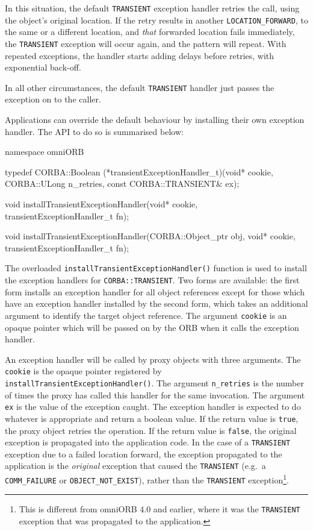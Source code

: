 \documentclass[11pt,twoside,a4paper]{book}
\newcommand{\code}[1]{\texttt{#1}}
\newcommand{\op}[1]{\texttt{#1()}}
\newcommand{\dsc}{\discretionary{}{}{}}
\begin{document}
In this situation, the default \code{TRANSIENT} exception handler
retries the call, using the object's original location. If the retry
results in another \code{LOCATION\_\dsc{}FORWARD}, to the same or a
different location, and \emph{that} forwarded location fails
immediately, the \code{TRANSIENT} exception will occur again, and the
pattern will repeat. With repeated exceptions, the handler starts
adding delays before retries, with exponential back-off.

In all other circumstances, the default \code{TRANSIENT} handler just
passes the exception on to the caller.

Applications can override the default behaviour by installing their
own exception handler. The API to do so is summarised below:

\begin{cxxlisting}
namespace omniORB {
  
  typedef CORBA::Boolean 
  (*transientExceptionHandler_t)(void* cookie,
                                 CORBA::ULong n_retries,
                                 const CORBA::TRANSIENT& ex);

  void 
  installTransientExceptionHandler(void* cookie,
                                   transientExceptionHandler_t fn);

  void
  installTransientExceptionHandler(CORBA::Object_ptr obj,
                                   void* cookie,
                                   transientExceptionHandler_t fn);
}
\end{cxxlisting}

The overloaded \op{installTransientExceptionHandler} function is used
to install the exception handlers for \code{CORBA::TRANSIENT}.  Two
forms are available: the first form installs an exception handler for
all object references except for those which have an exception handler
installed by the second form, which takes an additional argument to
identify the target object reference. The argument \code{cookie} is an
opaque pointer which will be passed on by the ORB when it calls the
exception handler.

An exception handler will be called by proxy objects with three
arguments. The \code{cookie} is the opaque pointer registered by
\op{installTransientException\dsc{}Handler}. The argument
\code{n\_retries} is the number of times the proxy has called this
handler for the same invocation. The argument \code{ex} is the value
of the exception caught.  The exception handler is expected to do
whatever is appropriate and return a boolean value. If the return
value is \code{true}, the proxy object retries the operation. If the
return value is \code{false}, the original exception is propagated
into the application code. In the case of a \code{TRANSIENT} exception
due to a failed location forward, the exception propagated to the
application is the \emph{original} exception that caused the
\code{TRANSIENT} (e.g.\ a \code{COMM\_FAILURE} or
\code{OBJECT\_NOT\_EXIST}), rather than the \code{TRANSIENT}
exception\footnote{This is different from omniORB 4.0 and earlier,
  where it was the \code{TRANSIENT} exception that was propagated to
  the application.}.
\end{document}

